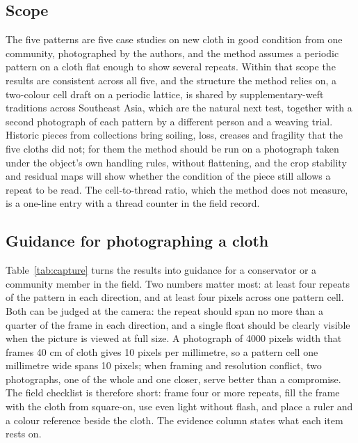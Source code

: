 \documentclass[12pt]{article}
\begin{document}
\subsection{Scope}

The five patterns are five case studies on new cloth in good condition from one community, photographed by the authors, and the method assumes a periodic pattern on a cloth flat enough to show several repeats. Within that scope the results are consistent across all five, and the structure the method relies on, a two-colour cell draft on a periodic lattice, is shared by supplementary-weft traditions across Southeast Asia, which are the natural next test, together with a second photograph of each pattern by a different person and a weaving trial. Historic pieces from collections bring soiling, loss, creases and fragility that the five cloths did not; for them the method should be run on a photograph taken under the object's own handling rules, without flattening, and the crop stability and residual maps will show whether the condition of the piece still allows a repeat to be read. The cell-to-thread ratio, which the method does not measure, is a one-line entry with a thread counter in the field record.

\subsection{Guidance for photographing a cloth}

Table~\ref{tab:capture} turns the results into guidance for a conservator or a community member in the field. Two numbers matter most: at least four repeats of the pattern in each direction, and at least four pixels across one pattern cell. Both can be judged at the camera: the repeat should span no more than a quarter of the frame in each direction, and a single float should be clearly visible when the picture is viewed at full size. A photograph of 4000 pixels width that frames 40 cm of cloth gives 10 pixels per millimetre, so a pattern cell one millimetre wide spans 10 pixels; when framing and resolution conflict, two photographs, one of the whole and one closer, serve better than a compromise. The field checklist is therefore short: frame four or more repeats, fill the frame with the cloth from square-on, use even light without flash, and place a ruler and a colour reference beside the cloth. The evidence column states what each item rests on.
\end{document}
